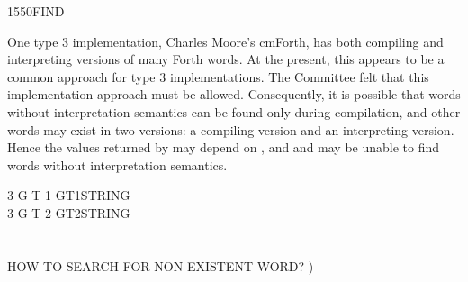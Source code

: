 \begin{worddef}{1550}{FIND}
\begin{rationale}
		One type 3 implementation, Charles Moore's cmForth, has both
		compiling and interpreting versions of many Forth words. At the
		present, this appears to be a common approach for type 3
		implementations. The Committee felt that this implementation
		approach must be allowed. Consequently, it is possible that
		words without interpretation semantics can be found only during
		compilation, and other words may exist in two versions: a
		compiling version and an interpreting version. Hence the values
		returned by  may depend on , and 
		and \word{[']} may be unable to find words without
		interpretation semantics.
	\end{rationale}

	\begin{testing} %
		\ttfamily
			3 
			 G 
			 T 
			 1 
			 GT1STRING \\
			3 
			 G 
			 T 
			 2 
			 GT2STRING \\
		 \\
		 \\
		 HOW TO SEARCH FOR NON-EXISTENT WORD? )
	\end{testing}
\end{worddef}


